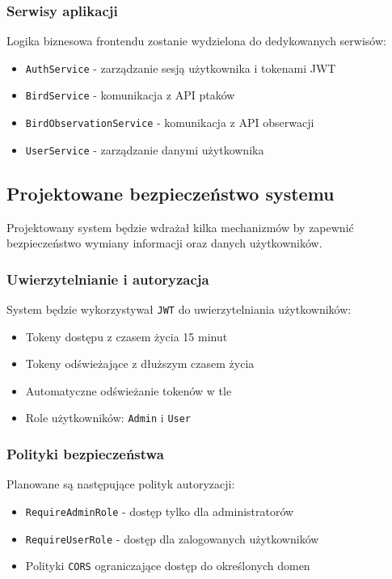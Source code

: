 \subsubsection{Serwisy aplikacji}
Logika biznesowa frontendu zostanie wydzielona do dedykowanych serwisów:
\begin{itemize}
	\item \texttt{AuthService} - zarządzanie sesją użytkownika i tokenami JWT
	\item \texttt{BirdService} - komunikacja z API ptaków
	\item \texttt{BirdObservationService} - komunikacja z API obserwacji
	\item \texttt{UserService} - zarządzanie danymi użytkownika
\end{itemize}

\subsection{Projektowane bezpieczeństwo systemu}
Projektowany system będzie wdrażał kilka mechanizmów by zapewnić bezpieczeństwo wymiany informacji oraz danych użytkowników.

\subsubsection{Uwierzytelnianie i autoryzacja}
System będzie wykorzystywał \texttt{JWT} do uwierzytelniania użytkowników:
\begin{itemize}
	\item Tokeny dostępu z czasem życia 15 minut
	\item Tokeny odświeżające z dłuższym czasem życia
	\item Automatyczne odświeżanie tokenów w tle
	\item Role użytkowników: \texttt{Admin} i \texttt{User}
\end{itemize}

\subsubsection{Polityki bezpieczeństwa}
Planowane są następujące polityk autoryzacji:
\begin{itemize}
	\item \texttt{RequireAdminRole} - dostęp tylko dla administratorów
	\item \texttt{RequireUserRole} - dostęp dla zalogowanych użytkowników
	\item Polityki \texttt{CORS} ograniczające dostęp do określonych domen
\end{itemize}

